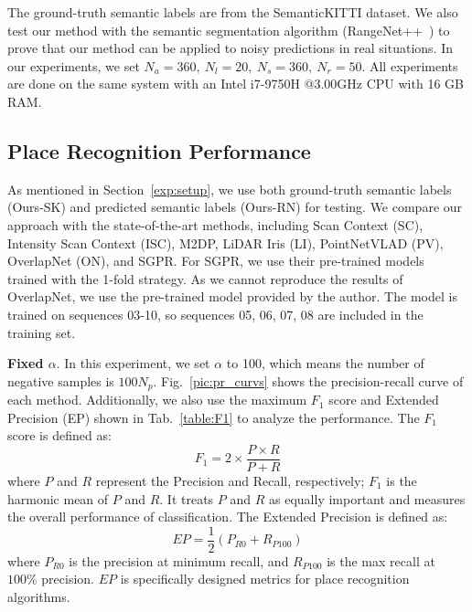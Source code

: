 \documentclass[letterpaper, 10 pt, conference]{ieeeconf}  %
\begin{document}
The ground-truth semantic labels are from the SemanticKITTI dataset\cite{semkitti}. We also test our method with the semantic segmentation algorithm (RangeNet++~\cite{rangenet++})  to prove that our method can be applied to noisy predictions in real situations. In our experiments, we set \(N_a=360,~N_l=20,~N_s=360,~N_r=50\). All experiments are done on the same system with an Intel i7-9750H @3.00GHz CPU with 16 GB RAM.

\subsection{Place Recognition Performance}\label{seu:pr}
As mentioned in Section~\ref{exp:setup}, we use both ground-truth semantic labels (Ours-SK) and predicted semantic labels (Ours-RN) for testing. We compare our approach with the state-of-the-art methods, including Scan Context\cite{SC} (SC), Intensity Scan Context\cite{ISC} (ISC), M2DP\cite{M2DP}, LiDAR Iris\cite{LI} (LI), PointNetVLAD\cite{PV} (PV), OverlapNet\cite{ON} (ON), and SGPR\cite{SGPR}. For SGPR, we use their pre-trained models trained with the 1-fold strategy. As we cannot reproduce the results of OverlapNet, we use the pre-trained model provided by the author. The model is trained on sequences 03-10, so sequences 05, 06, 07, 08 are included in the training set.

\textbf{Fixed \(\alpha\)}. In this experiment, we set \(\alpha\) to 100, which means the number of negative samples is \(100N_{p}\). Fig.~\ref{pic:pr_curvs} shows the precision-recall curve of each method. Additionally, we also use the maximum \(F_1\) score and Extended Precision\cite{EP} (EP) shown in Tab.~\ref{table:F1} to analyze the performance. The \(F_1\) score is defined as:
\begin{equation}
    F_1=2\times \frac{P\times R}{P+R}
\end{equation}
where \(P\) and \(R\) represent the Precision and Recall, respectively; \(F_1\) is the harmonic mean of \(P\) and \(R\). It treats \(P\) and \(R\) as equally important and measures the overall performance of classification. The Extended Precision is defined as:
\begin{equation}
    EP=\frac{1}{2}(P_{R0}+R_{P100})
\end{equation}
where \(P_{R0}\) is the precision at minimum recall, and \(R_{P100}\) is the max recall at \(100\%\) precision. \(EP\) is specifically designed metrics for place recognition algorithms. 
\end{document}
